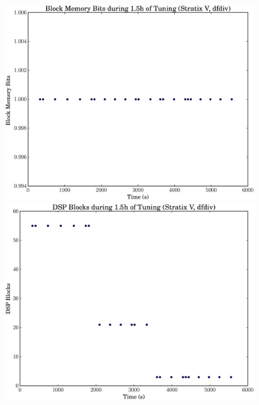 \documentclass[12pt, a4paper]{article}
\begin{document}
\begin{figure}[htpb]
    \begin{minipage}{.48\textwidth}
        \includegraphics[scale=.25]{dfdiv_block_5400_chstone_StratixV}
    \end{minipage}%
    \hfill
    \begin{minipage}{.48\textwidth}
        \includegraphics[scale=.25]{dfdiv_dsp_5400_chstone_StratixV}
    \end{minipage}%


\end{figure}
\end{document}
